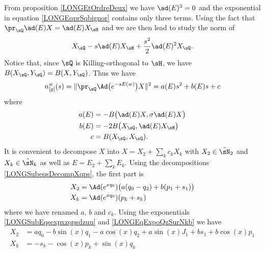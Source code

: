 %
From proposition \ref{LONGEtOrdreDeux} we have $\ad(E)^3=0$ and the exponential in equation \eqref{LONGEqprSqbignor} contains only three terms. Using the fact that $\pr_{\sQ}\ad(E)X=\ad(E)X_{\sH}$ and  we are then lead to study the norm of
\begin{equation}
    X_{\sQ}-s\ad(E)X_{\sH}+\frac{ s^2 }{2}\ad(E)^2X_{\sQ}.
\end{equation}
Notice that, since $\sQ$ is Killing-orthogonal to $\sH$, we have $B(X_{\sQ},Y_{\sQ})=B(X,Y_{\sQ})$. Thus we have
\begin{equation}
    n_{[g]}^w(s)=\|   \pr_{\sQ} \Ad\big(  e^{-s E(w)} \big)X  \|^2=a(E)s^2+b(E)s+c
\end{equation}
where
\begin{subequations}        \label{LONGSubEqsabcEBBB}
    \begin{align}
        a(E)&=-B\big( \ad(E)X,\sigma\ad(E)X \big)        \label{LONGEqCoefaEBX}\\
        b(E)&=-2B\big( X_{\sQ},\ad(E)X_{\sH} \big)\\
        c&=B(X_{\sQ},X_{\sQ}).
    \end{align}
\end{subequations}
%
%
It is convenient to decompose $X$ into $X=X_2+\sum_kc_kX_k$ with $X_2\in\tilde\sN_2$ and $X_k\in\tilde\sN_k$ as well as $E=E_2+\sum_kE_k$. Using the decompositions \eqref{LONGSubeqsDecompXqps}, the first part is
\begin{equation}
    \begin{aligned}[]
        X_2&=\Ad( e^{xq_0})\big( a(q_0-q_2)+b(p_1+s_1) \big)    \label{LONGEqXsiAdSTrois}\\
        X_k&=\Ad( e^{xq_0})(p_k+s_k)
    \end{aligned}
\end{equation}
%
where we have renamed $a$, $b$ and $c_k$. Using the exponentials \eqref{LONGSubEqsexpxzqpsdzuu} and \eqref{LONGEqExpoQzSurNkb} we have
\begin{subequations}
    \begin{align}
        X_2 &= aq_0-b\sin(x)q_1-a\cos(x)q_2 +a\sin(x)J_1+b s_1+b\cos(x)p_1    \label{LONGsubEqXtroisdonne}\\
        X_k &= -s_k-\cos(x)p_k+\sin(x)q_k                    \label{LONGsubEqXkdonne}
    \end{align}
\end{subequations}

